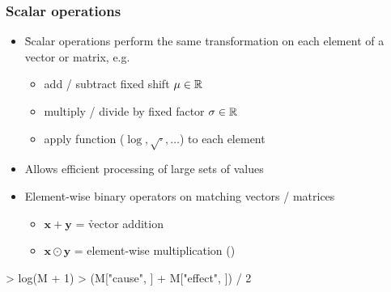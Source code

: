 \documentclass[t]{beamer} %
\begin{document}
\begin{frame}[fragile]
  \frametitle{Scalar operations}
  
  \begin{itemize}
  \item \h{Scalar} operations perform the same transformation on each element of a vector or matrix, e.g.\
    \begin{itemize}
    \item add / subtract fixed shift $\mu\in \mathbb{R}$
    \item multiply / divide by fixed factor $\sigma\in \mathbb{R}$
    \item apply function ($\log, \sqrt{\cdot}, \ldots$) to each element
    \end{itemize}
  \item Allows efficient processing of large sets of values
  \item<2-> Element-wise binary operators on matching vectors / matrices
    \begin{itemize}
    \item $\mathbf{x} + \mathbf{y}$ = \h{vector addition}
    \item $\mathbf{x} \odot \mathbf{y}$ = element-wise multiplication ()
    \end{itemize}
  \end{itemize}
  
\begin{Rcode}
> log(M + 1) 
> (M["cause", ] + M["effect", ]) / 2 
\end{Rcode}
\end{frame}
\end{document}

